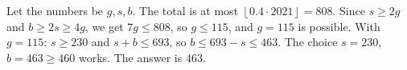 Let the numbers be $g,s,b$. The total is at most $\left\lfloor0.4\cdot2021\right\rfloor=808$. Since $s\ge2g$ and $b\ge2s\ge4g$, we get $7g\le808$, so $g\le115$, and $g=115$ is possible. With $g=115$: $s\ge230$ and $s+b\le693$, so $b\le693-s\le463$. The choice $s=230$, $b=463\ge460$ works. The answer is $\boxed{463}$.
